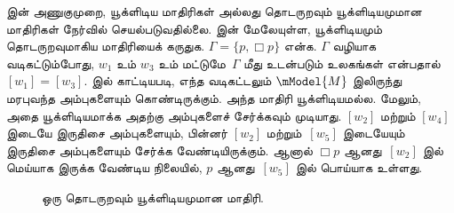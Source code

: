 \documentclass[../../../include/open-logic-section]{subfiles}
\begin{document}


 இன் அணுகுமுறை, யூக்ளிடிய மாதிரிகள் அல்லது தொடருறவும்
யூக்ளிடியமுமான மாதிரிகள் நேர்வில் செயல்படுவதில்லை.
 இன் மேலேயுள்ள, யூக்ளிடியமும் தொடருறவுமாகிய மாதிரியைக்
கருதுக. $\Gamma = \{p, \Box p \}$ என்க. $\Gamma$ வழியாக வடிகட்டும்போது,
$w_1$ உம் $w_3$ உம் மட்டுமே~$\Gamma$ மீது உடன்படும் உலகங்கள் என்பதால்
$[w_1] = [w_3]$.  இல் காட்டியபடி, எந்த வடிகட்டலும்
$\mModel{M}$ இலிருந்து மரபுவந்த அம்புகளையும் கொண்டிருக்கும். அந்த மாதிரி
யூக்ளிடியமல்ல. மேலும், அதை யூக்ளிடியமாக்க அதற்கு அம்புகளைச் சேர்க்கவும்
முடியாது. $[w_2]$ மற்றும் $[w_4]$ இடையே இருதிசை அம்புகளையும், பின்னர்
$[w_2]$ மற்றும்~$[w_5]$ இடையேயும் இருதிசை அம்புகளையும் சேர்க்க வேண்டியிருக்கும்.
ஆனால் $\Box p$ ஆனது~$[w_2]$ இல் மெய்யாக இருக்க வேண்டிய நிலையில், $p$
ஆனது~$[w_5]$ இல் பொய்யாக உள்ளது.

\begin{figure}[htpb]
  \centering
  \caption{ஒரு தொடருறவும் யூக்ளிடியமுமான மாதிரி.}
\end{figure}
\end{document}
